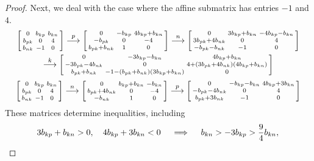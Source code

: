 \documentclass[10pt]{article}
\theoremstyle{definition}
\theoremstyle{remark}
\numberwithin{equation}{section}
\newcommand{\0}{{\mathbf{0}}}
\begin{document}
\begin{proof}
Next, we deal with the case where the affine submatrix has entries $-1$ and $4$.
\begin{multline*}
\begin{bsmallmatrix*}
	0 & b_{kp} & b_{kn} \\
	b_{pk} & 0 & 4	 \\
	b_{nk} & -1 & 0
\end{bsmallmatrix*}
\overset{p}{\longrightarrow}
\begin{bsmallmatrix*}
	0 & -b_{kp} & 4b_{kp}+b_{kn} \\
	-b_{pk} & 0 & -4 \\
	b_{pk}+b_{nk}& 1 & 0
\end{bsmallmatrix*}
\overset{n}{\longrightarrow}
\begin{bsmallmatrix*}
	0 & 3b_{kp}+b_{kn}& -4b_{kp}-b_{kn} \\
	3b_{pk}+4b_{nk} & 0 & 4 \\
	-b_{pk}-b_{nk}& -1 & 0
\end{bsmallmatrix*}\\
\overset{k}{\longrightarrow}
\begin{bsmallmatrix*}
	0 & -3b_{kp}-b_{kn}& 4b_{kp}+b_{kn} \\
	-3b_{pk}-4b_{nk} & 0 & 4+(3b_{pk}+4b_{nk})(4b_{kp}+b_{kn}) \\
	b_{pk}+b_{nk}& -1-(b_{pk}+b_{nk})(3b_{kp}+b_{kn}) & 0
\end{bsmallmatrix*}
\end{multline*}
\begin{multline*}
\begin{bsmallmatrix*}
	0 & b_{kp} & b_{kn} \\
	b_{pk} & 0 & 4	 \\
	b_{nk} & -1 & 0
\end{bsmallmatrix*}\overset{n}{\longrightarrow}
\begin{bsmallmatrix*}
	0 & b_{kp}+b_{kn} & -b_{kn} \\
	b_{pk}+4b_{nk} & 0 & -4	 \\
	-b_{nk} & 1 & 0
\end{bsmallmatrix*}\overset{p}{\longrightarrow}
\begin{bsmallmatrix*}
	0 & -b_{kp}-b_{kn} & 4b_{kp}+3b_{kn} \\
	-b_{pk}-4b_{nk} & 0 & 4	 \\
	b_{pk}+3b_{nk} & -1 & 0
\end{bsmallmatrix*}
\end{multline*}
These matrices determine inequalities, including
\[
3b_{kp}+b_{kn}>0,\quad 4b_{kp}+3b_{kn}<0\quad \implies\quad b_{kn}>-3b_{kp}>\frac94b_{kn},\\
\]
\end{proof}
\end{document}
